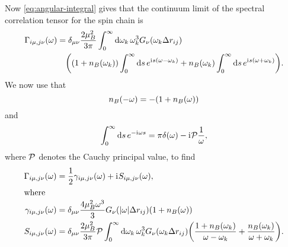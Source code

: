 \documentclass[../thesis.tex]{subfiles}
\begin{document}
Now \cref{eq:angular-integral} gives that the continuum limit of the spectral
correlation tensor for the spin chain is
\begin{align}
  \begin{split}
  \Gamma_{i\mu,j\nu}(\omega)
  &= \delta_{\mu\nu} \frac{2\mu_B^2}{3\pi}
  \int_0^\infty \dd{\omega_k} \omega_k^3
  G_{\nu}\qty(\omega_k \Delta r_{ij})
  \\
  &\quad\qty(%
  \qty(1 + n_B(\omega_k)) \int_0^\infty \dd{s} e^{\im s(\omega - \omega_k)}
  + n_B(\omega_k) \int_0^\infty \dd{s} e^{\im s(\omega + \omega_k)}
  ).
  \end{split}
\end{align}
We now use that
\begin{equation}
  n_B(-\omega)
  = -\qty(1 + n_B(\omega))
\end{equation}
and 
\begin{equation}
  \int_0^\infty \dd{s} e^{-\im\omega s}
  = \pi\delta(\omega) - \im\pv\frac{1}{\omega},
\end{equation}
where $\pv$ denotes the Cauchy principal value, to find
\begin{align}
  \Gamma_{i\mu,j\nu}(\omega)
  &= \frac{1}{2}\gamma_{i\mu,j\nu}(\omega) + \im S_{i\mu,j\nu}(\omega),
  \\
  \shortintertext{where}
  \gamma_{i\mu,j\nu}(\omega)
  &= \delta_{\mu\nu} \frac{4\mu_B^2 \omega^3}{3}
  G_{\nu}\qty(\abs{\omega} \Delta r_{ij})
  (1 + n_B(\omega))
  \label{eq:gamma-full}
  \\
  S_{i\mu,j\nu}(\omega)
  &= \delta_{\mu\nu} \frac{2\mu_B^2}{3\pi}
  \pv\int_0^\infty \dd{\omega_k} \omega_k^3
  G_{\nu}\qty(\omega_k \Delta r_{ij})
  \qty(\frac{1 + n_B(\omega_k)}{\omega - \omega_k}
  + \frac{n_B(\omega_k)}{\omega + \omega_k}).
  \label{eq:S-full}
\end{align}
\end{document}
